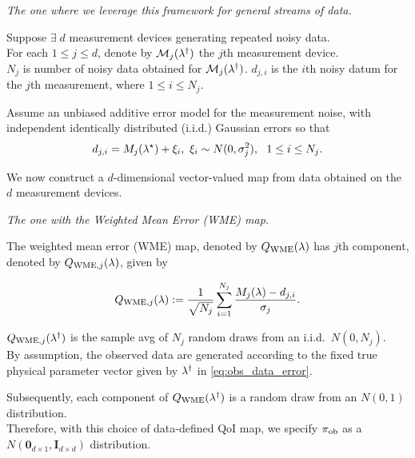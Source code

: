 \begin{frame}{\it The one where we leverage this framework for general streams of data.}

Suppose $\exists \; d$ measurement devices generating repeated noisy data. \\
\vskip 12pt
For each $1\leq j\leq d$, denote by $\mathcal{M}_j(\lambda^\dagger)$ the $j$th measurement device. \\

$N_j$ is number of noisy data obtained for $\mathcal{M}_j(\lambda^\dagger)$.
\vskip 12pt
$d_{j,i}$ is the $i$th noisy datum for the $j$th measurement, where $1\leq i\leq N_j$.

\vskip 12pt
Assume an unbiased additive error model for the measurement noise,
with independent identically distributed (i.i.d.) Gaussian errors so that
\begin{equation}\label{eq:obs_data_error}
	d_{j,i} = M_j(\param^\star) + \xi_i, \ \xi_i\sim N(0,\sigma_j^2), \ \ 1\leq i\leq N_j.
\end{equation}

\vskip 12pt
We now construct a $d$-dimensional vector-valued map from data obtained on the $d$ measurement devices.

\end{frame}


\begin{frame}{\it The one with the Weighted Mean Error (WME) map.}


The weighted mean error (WME) map, denoted by $Q_\text{WME}(\lambda)$ has $j$th component, denoted by $Q_{\text{WME},j}(\lambda)$, given by

\begin{equation}\label{eq:qoi_WME}
	Q_{\text{WME},j}(\lambda) := \frac{1}{\sqrt{N_j}} \sum_{i=1}^{N_j} \frac{M_j(\lambda)-d_{j,i}}{\sigma_j}.
\end{equation}

\vskip 12pt
$Q_{\text{WME},j}(\lambda^\dagger)$ is the sample avg of $N_j$ random draws from an i.i.d.~$N(0,N_j)$.\\
By assumption, the observed data are generated according to the fixed true physical parameter vector given by $\lambda^\dagger$ in \eqref{eq:obs_data_error}.

\vskip 12pt
Subsequently, each component of $Q_\text{WME}(\lambda^\dagger)$ is a random draw from an $N(0,1)$ distribution.\\
Therefore, with this choice of data-defined QoI map, we specify $\operatorname*{\pi_{ob}}$ as a $N(\mathbf{0}_{d\times 1},\mathbf{I}_{d\times d})$ distribution.

\end{frame}

